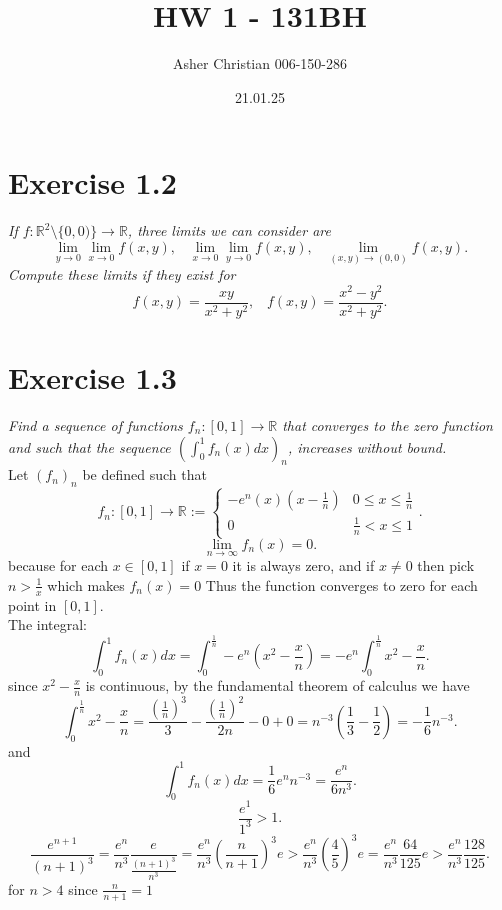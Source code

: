 \documentclass{amsart}
\title{HW 1 - 131BH}
\author{Asher Christian 006-150-286}
\date{ 21.01.25}
\begin{document}
    \maketitle
    \section{Exercise 1.2}
    \emph{If $f: \mathbb{R}^2 \setminus \{0,0)\} \rightarrow \mathbb{R}$, three limits we can consider are
        \[
        \lim_{y\to 0}\lim_{x\to 0}f(x,y), \;\;\; \lim_{x\to 0}\lim_{y\to 0}f(x,y), \;\;\; \lim_{(x,y)\to (0,0)}f(x,y)
        .\] 
        Compute these limits if they exist for
        \[
        f(x,y) = \frac{xy}{x^2+y^2}, \;\;\; f(x,y) = \frac{x^2-y^2}{x^2+y^2}
        .\] 
    }

    \section{Exercise 1.3}
    \emph{Find a sequence of functions $f_n: [0,1] \rightarrow \mathbb{R}$ that converges to the
        zero function and such that the sequence $( \int_{0}^{1}f_n(x)dx)_n$, increases without bound.
    }\\
    Let $(f_n)_n$ be defined such that
    \[
        f_n : [0,1] \rightarrow \mathbb{R} :=
    \begin{cases}
        -e^{n}(x)(x-\frac{1}{n}) & 0 \le x \le \frac{1}{n}\\
        0 & \frac{1}{n} < x \le 1
    \end{cases}
    .\] 
     \[
    \lim_{n\to \infty}f_n(x) = 0
    .\] 
    because for each $x \in [0,1]$ if $x = 0$ it is always zero, and if $x \ne 0$ then pick $n > \frac{1}{x}$ which makes $f_n(x) = 0$ 
    Thus the function converges to zero for each point in $[0,1]$.\\
    The integral:
    \[
    \int_{0}^{1}f_n(x)dx = \int_{0}^{\frac{1}{n}}-e^{n}(x^2-\frac{x}{n}) = -e^{n}\int_{0}^{\frac{1}{n}}x^2-\frac{x}{n} 
    .\] 
    since $x^2-\frac{x}{n}$ is continuous, by the fundamental theorem of calculus we have
    \[
    \int_{0}^{\frac{1}{n}}x^2-\frac{x}{n} = \frac{(\frac{1}{n})^{3}}{3}-\frac{(\frac{1}{n})^2}{2n} - 0 + 0 = n^{-3}(\frac{1}{3}-\frac{1}{2}) = -\frac{1}{6}n^{-3}
    .\] 
    and
    \[
        \int_{0}^{1}f_n(x)dx = \frac{1}{6}e^{n}n^{-3} = \frac{e^{n}}{6n^{3}}
    .\] 
    \[
        \frac{e^{1}}{1^{3}} > 1
    .\] 
    \[
    \frac{e^{n+1}}{(n+1)^{3}} = \frac{e^{n}}{n^{3}} \frac{e}{\frac{(n+1)^{3}}{n^{3}}} = \frac{e^{n}}{n^{3}} (\frac{n}{n+1})^{3}e  > \frac{e^{n}}{n^{3}} (\frac{4}{5})^{3}e = \frac{e^{n}}{n^{3}} \frac{64}{125}e > \frac{e^{n}}{n^{3}} \frac{128}{125}
    .\] 
    for $n > 4$ since $\frac{n}{n+1} = 1 $
\end{document}
